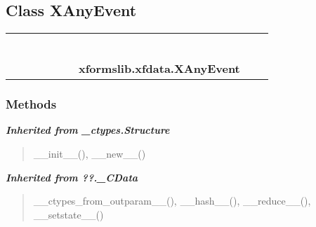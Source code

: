 
\subsection{Class XAnyEvent}

    \label{xformslib:xfdata:XAnyEvent}
\begin{tabular}{cccccccccc}
\multicolumn{2}{r}{\settowidth{\BCL}{object}\multirow{2}{\BCL}{object}}
&&
&&
&&
  \\\cline{3-3}
  &&\multicolumn{1}{c|}{}
&&
&&
&&
  \\
\multicolumn{4}{r}{\settowidth{\BCL}{??.\_CData}\multirow{2}{\BCL}{??.\_CData}}
&&
&&
  \\\cline{5-5}
  &&&&\multicolumn{1}{c|}{}
&&
&&
  \\
\multicolumn{6}{r}{\settowidth{\BCL}{\_ctypes.Structure}\multirow{2}{\BCL}{\_ctypes.Structure}}
&&
  \\\cline{7-7}
  &&&&&&\multicolumn{1}{c|}{}
&&
  \\
&&&&&&\multicolumn{2}{l}{\textbf{xformslib.xfdata.XAnyEvent}}
\end{tabular}



  \subsubsection{Methods}


\large{\textbf{\textit{Inherited from \_ctypes.Structure}}}

\begin{quote}
\_\_init\_\_(), \_\_new\_\_()
\end{quote}

\large{\textbf{\textit{Inherited from ??.\_CData}}}

\begin{quote}
\_\_ctypes\_from\_outparam\_\_(), \_\_hash\_\_(), \_\_reduce\_\_(), \_\_setstate\_\_()
\end{quote}

